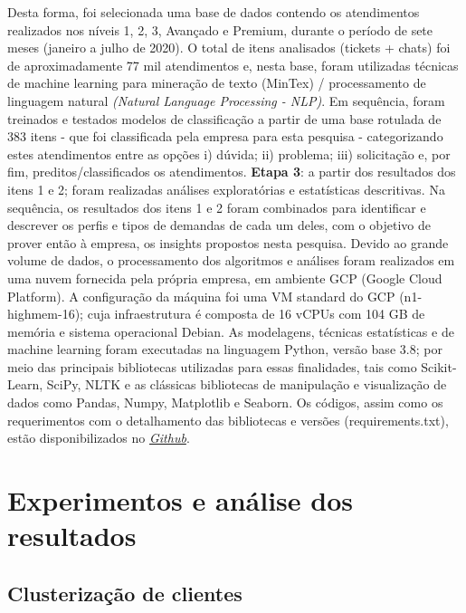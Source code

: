 \documentclass[twocolumn]{rbef}
\newcommand{\1}{\mathbbm{1}}
\begin{document}
Desta forma, foi selecionada uma base de dados contendo os atendimentos realizados nos níveis 1, 2, 3, Avançado e Premium, durante o período de sete meses (janeiro a julho de 2020). O total de itens analisados (tickets + chats) foi de aproximadamente 77 mil atendimentos e, nesta base, foram utilizadas técnicas de machine learning para mineração de texto (MinTex) / processamento de linguagem natural \emph{(Natural Language Processing - NLP)}. Em sequência, foram treinados e testados modelos de classificação a partir de uma base rotulada de 383 itens - que foi classificada pela empresa para esta pesquisa - categorizando estes atendimentos entre as opções i) dúvida; ii) problema; iii) solicitação e, por fim, preditos/classificados os atendimentos.
\newline\linebreak\textbf{Etapa 3}: a partir dos resultados dos itens 1 e 2; foram realizadas análises exploratórias e  estatísticas descritivas. Na sequência, os resultados dos itens 1 e 2 foram combinados para identificar e descrever os perfis e tipos de demandas de cada um deles, com o objetivo de prover então à empresa, os insights propostos nesta pesquisa.
Devido ao grande volume de dados, o processamento dos algoritmos e análises foram realizados em uma nuvem fornecida pela própria empresa, em ambiente GCP (Google Cloud Platform). A configuração da máquina foi uma VM standard do GCP (n1-highmem-16); cuja infraestrutura é composta de 16 vCPUs com 104 GB de memória e sistema operacional Debian.
As modelagens, técnicas estatísticas e de machine learning foram executadas na linguagem Python, versão base 3.8; por meio das principais bibliotecas utilizadas para essas finalidades, tais como Scikit-Learn, SciPy, NLTK e as clássicas bibliotecas de manipulação e visualização de dados como Pandas, Numpy, Matplotlib e Seaborn.
Os códigos, assim como os requerimentos com o detalhamento das bibliotecas e versões (requirements.txt), estão disponibilizados no \href{https://github.com/aphonsoar/Data-Science-Big-Data-UFPR}{\emph{Github}}.




\section{Experimentos e análise dos resultados} \label{Sessao4}
\subsection{Clusterização de clientes} \label{Sessao4.1}
\end{document}
